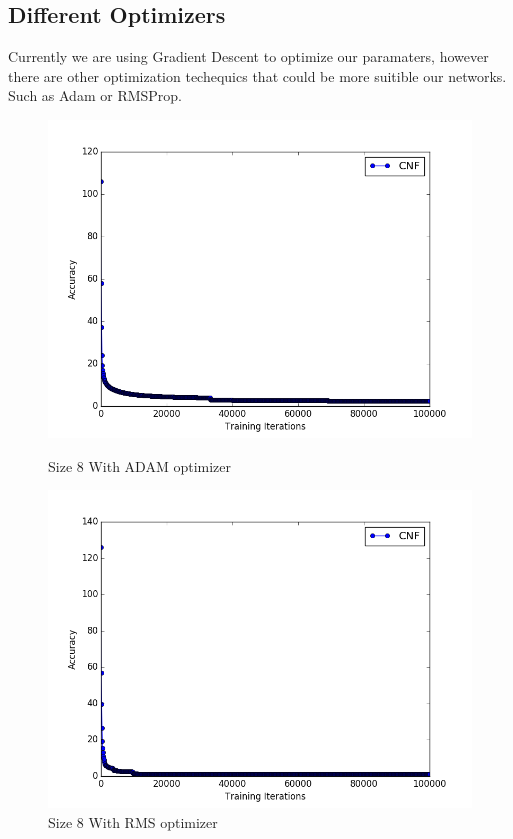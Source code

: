 \documentclass{article}
\theoremstyle{definition}
\begin{document}
\subsection{Different Optimizers}
Currently we are using Gradient Descent to optimize our paramaters, however there are other optimization techequics that could be more suitible our networks. Such as Adam or RMSProp.

\begin{figure}[H]
\centering
  \begin{minipage}[b]{0.4\textwidth}
    \includegraphics[width=\textwidth]{CNF-OP-ADAM-01.png}
    \caption{Size 8 With ADAM optimizer}
  \end{minipage}
  \hfill
  \begin{minipage}[b]{0.4\textwidth}
    \includegraphics[width=\textwidth]{CNF-OP-RMS-01.png}
    \caption{Size 8 With RMS optimizer}
  \end{minipage}
\end{figure}
\end{document}
